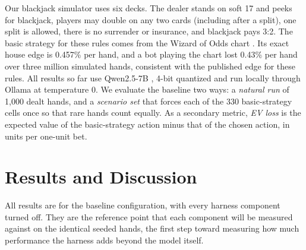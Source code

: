 

Our blackjack simulator uses six decks. The dealer stands on soft 17 and peeks
for blackjack, players may double on any two cards (including after a split),
one split is allowed, there is no surrender or insurance, and blackjack pays
3:2. The basic strategy for these rules comes from the Wizard of Odds chart
\cite{wizardofodds}. Its exact house edge is 0.457\% per hand, and a bot playing the chart lost 0.43\% per hand over three million simulated hands, consistent with the published edge for these rules. All results so
far use Qwen2.5-7B \cite{qwen2024qwen25}, 4-bit quantized and run locally
through Ollama at temperature 0. We evaluate the baseline two ways: a
\emph{natural run} of 1,000 dealt hands, and a \emph{scenario set} that forces
each of the 330 basic-strategy cells once so that rare hands count equally. As
a secondary metric, \emph{EV loss} is the expected value of the basic-strategy
action minus that of the chosen action, in units per one-unit bet.


\section{Results and Discussion}
\label{sec:results}

All results are for the baseline configuration, with every harness component
turned off. They are the reference point that each component will be measured
against on the identical seeded hands, the first step toward measuring how
much performance the harness adds beyond the model itself.


